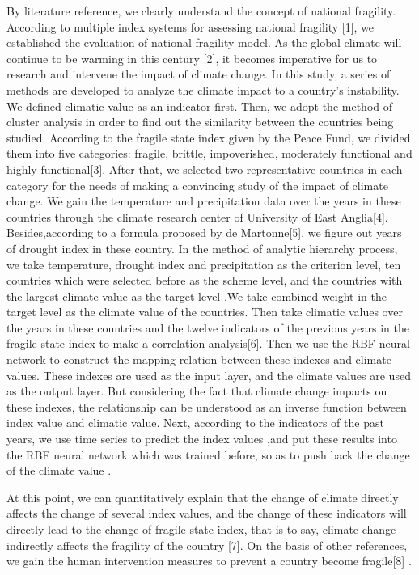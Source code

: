 \documentclass{mcmthesis}
\begin{document}
\par By literature reference, we clearly understand the concept of national fragility. According to multiple index systems for assessing national fragility [1], we established the evaluation of national fragility model. As the global climate will continue to be warming in this century [2], it becomes imperative for us to research and intervene the impact of climate change. In this study, a series of methods are developed to analyze the climate impact to a country's instability. We defined climatic value as an indicator first. Then, we adopt the method of cluster analysis in order to find out the similarity between the countries being studied. According to the fragile state index given by the Peace Fund, we divided them into five categories: fragile, brittle, impoverished, moderately functional and highly functional[3]. After that, we selected two representative countries in each category for the needs of  making a convincing study of the impact of climate change. We gain the temperature and precipitation data over the years in these countries through the climate research center of University of East Anglia[4]. Besides,according to a formula proposed by de Martonne[5], we figure out years of drought index in these country. In the method of  analytic hierarchy process, we take temperature, drought index and precipitation as the criterion level, ten countries which were selected before as the scheme level, and the countries with the largest climate value as the target level .We take combined weight in the target level as the climate value of the countries. Then take climatic values over the years in these countries and the twelve indicators of the previous years in the fragile state index to make a correlation analysis[6]. Then we use the RBF neural network to construct the mapping relation between these indexes and climate values. These indexes are used as the input layer, and the climate values are used as the output layer. But considering the fact that climate change impacts on these indexes, the relationship can be understood as an inverse function between index value and climatic value. Next, according to the indicators of the past years, we use time series to predict the index values ,and put these results into the RBF neural network which was trained before, so as to push back the change of the climate value .
\par At this point, we can quantitatively explain that the change of climate directly affects the change of several index values, and the change of these indicators will directly lead to the change of fragile state index, that is to say, climate change indirectly affects the fragility of the country [7]. On the basis of other references, we gain the human intervention measures to prevent a country become fragile[8] .
\end{document}
